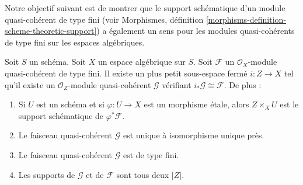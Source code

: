 \noindent
Notre objectif suivant est de montrer que le support schématique
d'un module quasi-cohérent de type fini (voir
Morphismes, définition \ref{morphisms-definition-scheme-theoretic-support})
a également un sens pour les modules quasi-cohérents de type fini sur les
espaces algébriques.

\begin{lemma}
\label{lemma-scheme-theoretic-support}
Soit $S$ un schéma. Soit $X$ un espace algébrique sur $S$.
Soit $\mathcal{F}$ un $\mathcal{O}_X$-module quasi-cohérent de type fini.
Il existe un plus petit sous-espace fermé $i : Z \to X$ tel qu'il
existe un $\mathcal{O}_Z$-module quasi-cohérent $\mathcal{G}$ vérifiant
$i_*\mathcal{G} \cong \mathcal{F}$. De plus :
\begin{enumerate}
\item Si $U$ est un schéma et si $\varphi : U \to X$ est un morphisme étale,
alors $Z \times_X U$ est le support schématique de $\varphi^*\mathcal{F}$.
\item Le faisceau quasi-cohérent $\mathcal{G}$ est unique à isomorphisme
unique près.
\item Le faisceau quasi-cohérent $\mathcal{G}$ est de type fini.
\item Les supports de $\mathcal{G}$ et de $\mathcal{F}$ sont tous deux $|Z|$.
\end{enumerate}
\end{lemma}

